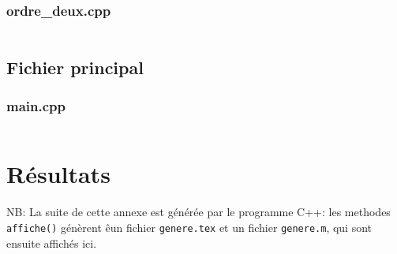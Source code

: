 \documentclass{report}
\begin{document}
\subsection{ordre\_deux.cpp}
\inputminted[linenos,fontsize=\scriptsize]{c++}{../src/source.cpp}

\section{Fichier principal}
\subsection{main.cpp}
\inputminted[linenos,fontsize=\scriptsize]{c++}{../src/main.cpp}


\chapter{Résultats}
NB: La suite de cette annexe est générée par le programme C++: les methodes \verb|affiche()| génèrent
êun fichier \verb|genere.tex| et un fichier \verb|genere.m|, qui sont ensuite affichés ici.

\end{document}
